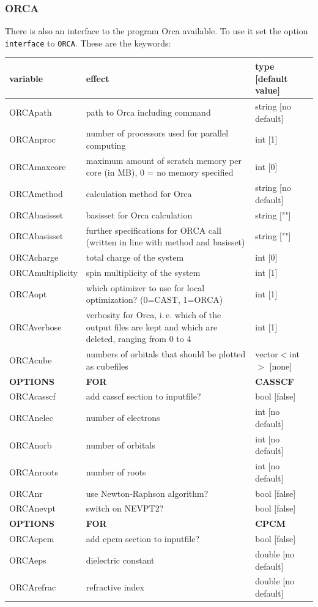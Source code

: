 \documentclass[10pt,a4paper]{article} %
\begin{document}
\subsubsection{ORCA}
	
There is also an interface to the program Orca available. To use it set the option \texttt{interface} to \texttt{ORCA}. These are the keywords:

\begin{longtable}{|p{3cm}|p{5cm}|p{3cm}|}
	variable & effect & type [default value] \\
	\hline
	ORCApath  & path to Orca including command & string [no default]\\
	ORCAnproc  & number of processors used for parallel computing & int [1]\\
	ORCAmaxcore  & maximum amount of scratch memory per core (in MB), 0 = no memory specified & int [0]\\
	ORCAmethod & calculation method for Orca & string [no default]\\
	ORCAbasisset & basisset for Orca calculation & string [""]\\
	ORCAbasisset & further specifications for ORCA call (written in line with method and basisset)  & string [""]\\
	ORCAcharge & total charge of the system & int [0] \\
	ORCAmultiplicity & spin multiplicity of the system & int [1] \\
	ORCAopt & which optimizer to use for local optimization? (0=CAST, 1=ORCA) & int [1] \\
	ORCAverbose & verbosity for Orca, i.\,e. which of the output files are kept and which are deleted, ranging from 0 to 4 & int [1] \\
	ORCAcube & numbers of orbitals that should be plotted as cubefiles & vector$<$int$>$ [none] \\
	\textbf{OPTIONS} & \textbf{FOR}  & \textbf{CASSCF}  \\
    ORCAcasscf & add casscf section to inputfile? & bool [false]   \\
    ORCAnelec  & number of electrons & int [no default]   \\
    ORCAnorb  & number of orbitals & int [no default]   \\
    ORCAnroots  & number of roots & int [no default]   \\
    ORCAnr & use Newton-Raphson algorithm?  & bool [false]   \\
    ORCAnevpt & switch on NEVPT2?  & bool [false]   \\
    \textbf{OPTIONS} & \textbf{FOR}  & \textbf{CPCM}  \\
    ORCAcpcm & add cpcm section to inputfile? & bool [false]   \\
    ORCAeps & dielectric constant & double [no default]   \\
    ORCArefrac & refractive index & double [no default]   \\
\end{longtable}
\end{document}
